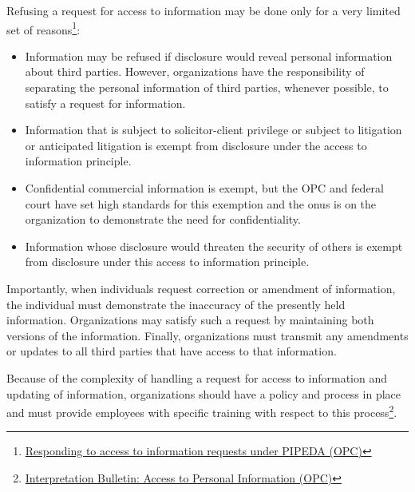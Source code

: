 Refusing a request for access to information may be done only for a very limited set of reasons\footnote{\href{https://www.priv.gc.ca/en/privacy-topics/accessing-personal-information/obligations-for-organizations/02_05_d_54_ati_02/}{Responding to access to information requests under PIPEDA (OPC)}}:

\begin{itemize}
   \item Information may be refused if disclosure would reveal personal information about third parties. However, organizations have the responsibility of separating the personal information of third parties, whenever possible, to satisfy a request for information. 
   \item Information that is subject to solicitor-client privilege or subject to litigation or anticipated litigation is exempt from disclosure under the access to information principle.
   \item Confidential commercial information is exempt, but the OPC and federal court have set high standards for this exemption and the onus is on the organization to demonstrate the need for confidentiality.
   \item Information whose disclosure would threaten the security of others is exempt from disclosure under this access to information principle.
\end{itemize}

Importantly, when individuals request correction or amendment of information, the individual must demonstrate the inaccuracy of the presently held information. Organizations may satisfy such a request by maintaining both versions of the information. Finally, organizations must transmit any amendments or updates to all third parties that have access to that information. 

Because of the complexity of handling a request for access to information and updating of information, organizations should have a policy and process in place and must provide employees with specific training with respect to this process\footnote{\href{https://www.priv.gc.ca/en/privacy-topics/privacy-laws-in-canada/the-personal-information-protection-and-electronic-documents-act-pipeda/pipeda-compliance-help/pipeda-interpretation-bulletins/interpretations_05_access/}{Interpretation Bulletin: Access to Personal Information (OPC)}}. 

